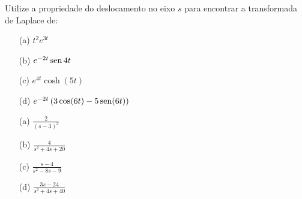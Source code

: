 \documentclass[Main.tex]{subfiles}
\begin{document}
\begin{Exercise}
Utilize a propriedade do deslocamento no eixo $s$ para encontrar a transformada de Laplace de:
\begin{itemize}
  \item[(a)] $t^2 e^{3t}$
  \item[(b)] $e^{-2t} \operatorname{sen} {4t}$
  \item[(c)] $e^{4t} \cosh (5t)$
  \item[(d)] $e^{-2t} \left( 3 \cos(6t) - 5 \operatorname{sen} (6t) \right)$
\end{itemize}
\end{Exercise}

\begin{Answer}
\begin{itemize}
   \item[(a)] $\displaystyle \frac{2}{(s-3)^3}$
  \item[(b)] $\displaystyle \frac{4}{s^2 +4s +20}$
  \item[(c)] $\displaystyle \frac{s-4}{s^2 - 8s - 9}$
  \item[(d)] $\displaystyle \frac{3s -24}{s^2 +4s + 40}$
\end{itemize}
  \end{Answer}
\end{document}
